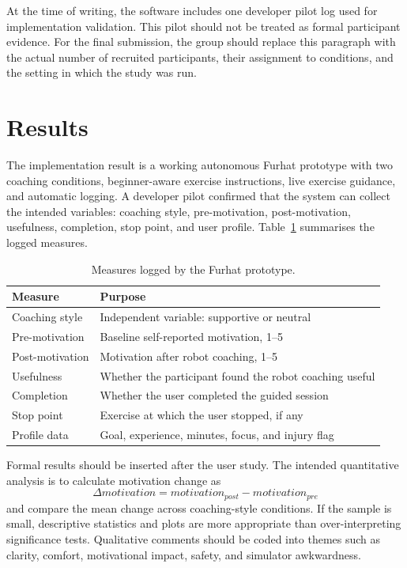 \documentclass[conference, onecolumn]{IEEEtran}
\begin{document}
At the time of writing, the software includes one developer pilot log used for implementation validation. This pilot should not be treated as formal participant evidence. For the final submission, the group should replace this paragraph with the actual number of recruited participants, their assignment to conditions, and the setting in which the study was run.

\section{Results}
The implementation result is a working autonomous Furhat prototype with two coaching conditions, beginner-aware exercise instructions, live exercise guidance, and automatic logging. A developer pilot confirmed that the system can collect the intended variables: coaching style, pre-motivation, post-motivation, usefulness, completion, stop point, and user profile. Table~\ref{tab:loggedvars} summarises the logged measures.

\begin{table}[h]
\centering
\caption{Measures logged by the Furhat prototype.}
\label{tab:loggedvars}
\begin{tabular}{|l|l|}
\hline
\textbf{Measure} & \textbf{Purpose} \\
\hline
Coaching style & Independent variable: supportive or neutral \\
Pre-motivation & Baseline self-reported motivation, 1--5 \\
Post-motivation & Motivation after robot coaching, 1--5 \\
Usefulness & Whether the participant found the robot coaching useful \\
Completion & Whether the user completed the guided session \\
Stop point & Exercise at which the user stopped, if any \\
Profile data & Goal, experience, minutes, focus, and injury flag \\
\hline
\end{tabular}
\end{table}

Formal results should be inserted after the user study. The intended quantitative analysis is to calculate motivation change as
\begin{equation}
\Delta motivation = motivation_{post} - motivation_{pre}
\end{equation}
and compare the mean change across coaching-style conditions. If the sample is small, descriptive statistics and plots are more appropriate than over-interpreting significance tests. Qualitative comments should be coded into themes such as clarity, comfort, motivational impact, safety, and simulator awkwardness.
\end{document}
